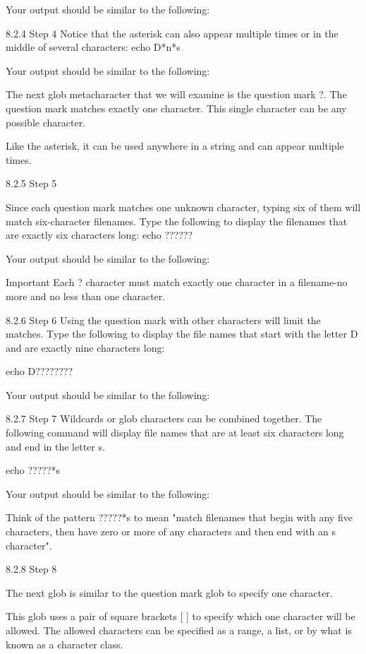 Your output should be similar to the following:

8.2.4 Step 4
Notice that the asterisk can also appear multiple times or in the middle of several characters:
echo D*n*s

Your output should be similar to the following:

The next glob metacharacter that we will examine is the question mark ?. The question mark
matches exactly one character. This single character can be any possible character.

Like the asterisk, it can be used anywhere in a string and can appear multiple times.

8.2.5 Step 5



Since each question mark matches one unknown character, typing six of them will match
six-character filenames. Type the following to display the filenames that are exactly six
characters long:
echo ??????

Your output should be similar to the following:

Important
Each ? character must match exactly one character in a filename-no more and no less than one
character.

8.2.6 Step 6
Using the question mark with other characters will limit the matches. Type the following to display
the file names that start with the letter D and are exactly nine characters long:

echo D????????

Your output should be similar to the following:

8.2.7 Step 7
Wildcards or glob characters can be combined together. The following command will display file
names that are at least six characters long and end in the letter s.

echo ?????*s

Your output should be similar to the following:

Think of the pattern ?????*s to mean "match filenames that begin with any five characters, then
have zero or more of any characters and then end with an s character".

8.2.8 Step 8



The next glob is similar to the question mark glob to specify one character.

This glob uses a pair of square brackets [ ] to specify which one character will be allowed. The
allowed characters can be specified as a range, a list, or by what is known as a character class.

